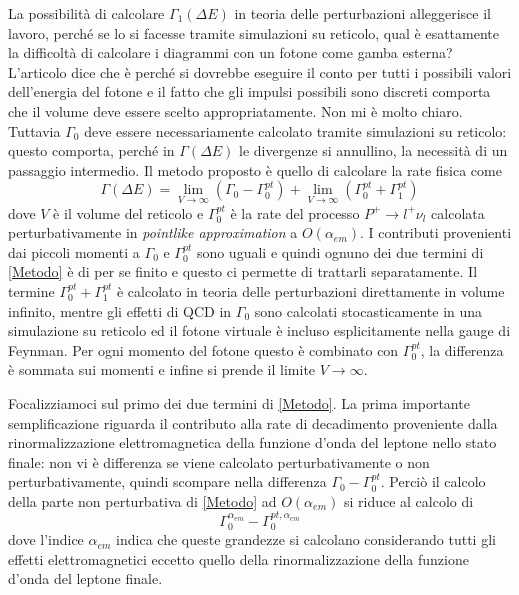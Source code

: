 \documentclass[LaM]{sapthesis}
\begin{document}
	La possibilità di calcolare $\Gamma_1(\Delta E)$ in teoria delle perturbazioni alleggerisce il lavoro, perché se lo si facesse tramite simulazioni su reticolo, \color{red} qual è esattamente la difficoltà di calcolare i diagrammi con un fotone come gamba esterna? L'articolo dice che è perché si dovrebbe eseguire il conto per tutti i possibili valori dell'energia del fotone e il fatto che gli impulsi possibili sono discreti comporta che il volume deve essere scelto appropriatamente. Non mi è molto chiaro\color{black}. Tuttavia $\Gamma_0$ deve essere necessariamente calcolato tramite simulazioni su reticolo: questo comporta, perché in $\Gamma(\Delta E)$ le divergenze si annullino, la necessità di un passaggio intermedio. Il metodo proposto è quello di calcolare la rate fisica come
	\begin{equation}
	\label{Metodo}
	\Gamma(\Delta E) = \lim_{V\to \infty}(\Gamma_0 -\Gamma_0^{pt})+\lim_{V\to \infty}(\Gamma_0^{pt} +\Gamma_1^{pt})
	\end{equation}
	dove $V$ è il volume del reticolo e $\Gamma_0^{pt}$ è la rate del processo $P^+\to l^+\nu_l$ calcolata perturbativamente in \emph{pointlike approximation} a $O(\alpha_{em})$. I contributi provenienti dai piccoli momenti a $\Gamma_0$ e $\Gamma_0^{pt}$ sono uguali e quindi ognuno dei due termini di \eqref{Metodo} è di per se finito e questo ci permette di trattarli separatamente. Il termine $\Gamma_0^{pt} +\Gamma_1^{pt}$ è calcolato in teoria delle perturbazioni direttamente in volume infinito, mentre gli effetti di QCD in $\Gamma_0$ sono calcolati stocasticamente in una simulazione su reticolo ed il fotone virtuale è incluso esplicitamente nella gauge di Feynman. Per ogni momento del fotone questo è combinato con $\Gamma_0^{pt}$, la differenza è sommata sui momenti e infine si prende il limite $V\to\infty$.
	
	Focalizziamoci sul primo dei due termini di \eqref{Metodo}. La prima importante semplificazione riguarda il contributo alla rate di decadimento proveniente dalla rinormalizzazione elettromagnetica della funzione d'onda del leptone nello stato finale: non vi è differenza se viene calcolato perturbativamente o non perturbativamente, quindi scompare nella differenza $\Gamma_0 -\Gamma_0^{pt}$. Perciò il calcolo della parte non perturbativa di \eqref{Metodo} ad $O(\alpha_{em})$ si riduce al calcolo di
	\begin{equation*}
	\Gamma_0^{\alpha_{em}}-\Gamma_0^{pt,\alpha_{em}}
	\end{equation*}
	dove l'indice $\alpha_{em}$ indica che queste grandezze si calcolano considerando tutti gli effetti elettromagnetici eccetto quello della rinormalizzazione della funzione d'onda del leptone finale.
	
\end{document}

